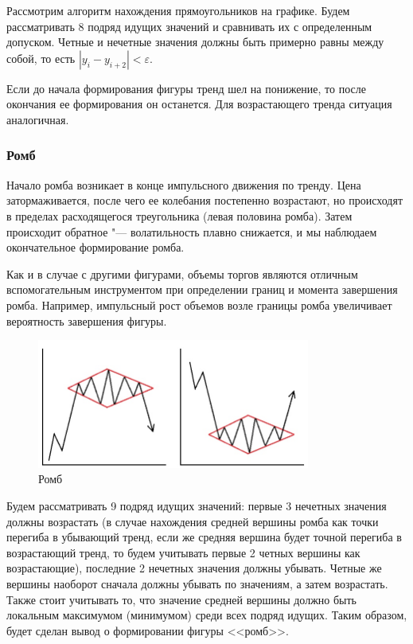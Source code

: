 \documentclass[bachelor, och, coursework]{SCWorks}
\begin{document}
    Рассмотрим алгоритм нахождения прямоугольников на графике. Будем
    рассматривать 8 подряд идущих значений и сравнивать их с определенным
    допуском. Четные и нечетные значения должны быть примерно равны между собой,
    то есть $|y_i - y_{i + 2}|<\varepsilon$.
    
    Если до начала формирования фигуры тренд шел на понижение, то после
    окончания ее формирования он останется. Для возрастающего тренда ситуация
    аналогичная.

    \subsubsection{Ромб}

    Начало ромба возникает в конце импульсного движения по тренду. Цена
    затормаживается, после чего ее колебания постепенно возрастают, но
    происходят в пределах расходящегося треугольника (левая половина ромба).
    Затем происходит обратное "--- волатильность плавно снижается, и мы
    наблюдаем окончательное формирование ромба.

    Как и в случае с другими фигурами, объемы торгов являются отличным
    вспомогательным инструментом при определении границ и момента завершения
    ромба. Например, импульсный рост объемов возле границы ромба увеличивает
    вероятность завершения фигуры.

    \begin{figure}[H]
        \centering
        \includegraphics[width=0.8\textwidth]{pic/rhombuses.jpg}
        \caption{Ромб}
    \end{figure}
   
    Будем рассматривать 9 подряд идущих значений: первые 3 нечетных значения
    должны возрастать (в случае нахождения средней вершины ромба как точки
    перегиба в убывающий тренд, если же средняя вершина будет точной перегиба в
    возрастающий тренд, то будем учитывать первые 2 четных вершины как
    возрастающие), последние 2 нечетных значения должны убывать. Четные же
    вершины наоборот сначала должны убывать по значениям, а затем возрастать.
    Также стоит учитывать то, что значение средней вершины должно быть локальным
    максимумом (минимумом) среди всех подряд идущих. Таким образом, будет сделан
    вывод о формировании фигуры <<ромб>>.
\end{document}
